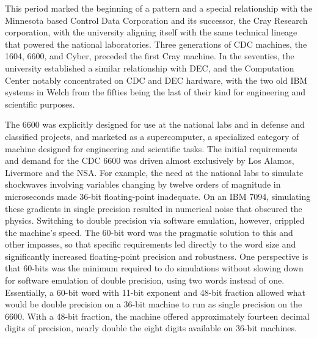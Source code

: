 This period marked the beginning of a pattern and a special relationship with the Minnesota based Control Data Corporation and its successor, the Cray Research corporation, with the university aligning itself with the same technical lineage that powered the national laboratories. Three generations of CDC machines, the 1604, 6600, and Cyber, preceded the first Cray machine. In the seventies, the university established a similar relationship with DEC, and the Computation Center notably concentrated on CDC and DEC hardware, with the two old IBM systems in Welch from the fifties being the last of their kind for engineering and scientific purposes.

The 6600 was explicitly designed for use at the national labs and in defense and classified projects, and marketed as a supercomputer, a specialized category of machine designed for engineering and scientific tasks. The initial requirements and demand for the CDC 6600 was driven almost exclusively by Los Alamos, Livermore and the NSA. For example, the need at the national labs to simulate shockwaves involving variables changing by twelve orders of magnitude in microseconds made 36-bit floating-point inadequate. On an IBM 7094, simulating these gradients in single precision resulted in numerical noise that obscured the physics. Switching to double precision via software emulation, however, crippled the machine's speed. The 60-bit word was the pragmatic solution to this and other impasses, so that specific requirements led directly to the word size and significantly increased floating-point precision and robustness. One perspective is that 60-bits was the minimum required to do simulations without slowing down for software emulation of double precision, using two words instead of one. Essentially, a 60-bit word with 11-bit exponent and 48-bit fraction allowed what would be double precision on a 36-bit machine to run as single precision on the 6600. With a 48-bit fraction, the machine offered approximately fourteen decimal digits of precision, nearly double the eight digits available on 36-bit machines. 

